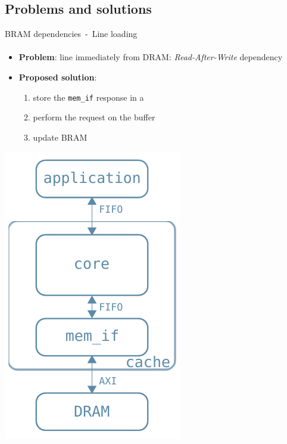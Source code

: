 \documentclass[handout,aspectratio=169]{beamer}
\begin{document}
\subsection{Problems and solutions}
\begin{frame}{BRAM dependencies~-~Line loading}
	\framesubtitle{}
	\begin{minipage}{.7\textwidth}
		\begin{itemize}[<+->]
			\item \textbf{Problem}:
				 line immediately
				 from DRAM:
				\emph{Read-After-Write} dependency
			\item \textbf{Proposed solution}:
				\begin{enumerate}[<.->]
					\item store the \texttt{mem\_if} response in a
					\item perform the request on the buffer
					\item update BRAM
				\end{enumerate}
		\end{itemize}
	\end{minipage}
	\begin{minipage}{.28\textwidth}
		\begin{center}
			\includegraphics[width=.8\textwidth]{internal_arch.pdf}
		\end{center}
	\end{minipage}
\end{frame}
\end{document}
